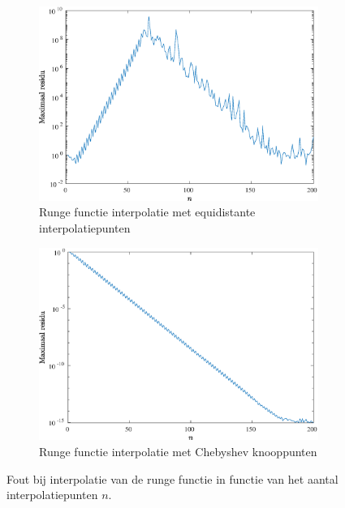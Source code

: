 \documentclass[a4paper, 12pt, titlepage, fleqn]{article}
\begin{document}
\begin{figure}
\begin{subfigure}[b]{0.45\textwidth}
\includegraphics[width=\linewidth]{../Afbeeldingen/runge_equi_fout.eps}
\caption{Runge functie interpolatie met equidistante interpolatiepunten}
\end{subfigure}
\hfill
\begin{subfigure}[b]{0.45\textwidth}
\includegraphics[width=\linewidth]{../Afbeeldingen/runge_nul_fout.eps}
\caption{Runge functie interpolatie met Chebyshev knooppunten}
\label{rungeNulFout}
\end{subfigure}
\caption{Fout bij interpolatie van de runge functie in functie van het aantal interpolatiepunten $n$.}
\label{fig:rungeFout}
\end{figure}
\end{document}

